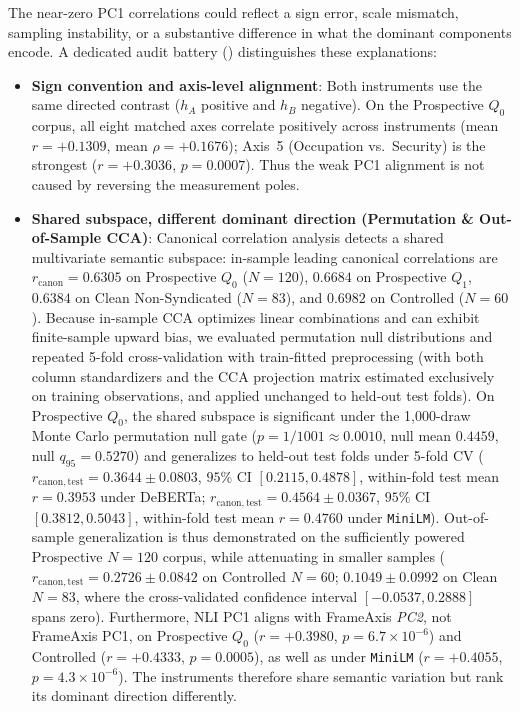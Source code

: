 The near-zero PC1 correlations could reflect a sign error, scale mismatch, sampling instability, or a substantive difference in what the dominant components encode. A dedicated audit battery () distinguishes these explanations:
\begin{itemize}
    \item \textbf{Sign convention and axis-level alignment}: Both instruments use the same directed contrast ($h_A$ positive and $h_B$ negative). On the Prospective $Q_0$ corpus, all eight matched axes correlate positively across instruments (mean $r = +0.1309$, mean $\rho = +0.1676$); Axis~5 (Occupation vs.\ Security) is the strongest ($r = +0.3036$, $p = 0.0007$). Thus the weak PC1 alignment is not caused by reversing the measurement poles.
    \item \textbf{Shared subspace, different dominant direction (Permutation \& Out-of-Sample CCA)}: Canonical correlation analysis detects a shared multivariate semantic subspace: in-sample leading canonical correlations are $r_{\mathrm{canon}} = 0.6305$ on Prospective $Q_0$ ($N=120$), $0.6684$ on Prospective $Q_1$, $0.6384$ on Clean Non-Syndicated ($N=83$), and $0.6982$ on Controlled ($N=60$). Because in-sample CCA optimizes linear combinations and can exhibit finite-sample upward bias, we evaluated permutation null distributions and repeated 5-fold cross-validation with train-fitted preprocessing (with both column standardizers and the CCA projection matrix estimated exclusively on training observations, and applied unchanged to held-out test folds). On Prospective $Q_0$, the shared subspace is significant under the 1,000-draw Monte Carlo permutation null gate ($p = 1/1001 \approx 0.0010$, null mean $0.4459$, null $q_{95} = 0.5270$) and generalizes to held-out test folds under 5-fold CV ($r_{\mathrm{canon,test}} = \mathbf{0.3644} \pm 0.0803$, $95\%$ CI $[0.2115, 0.4878]$, within-fold test mean $r = 0.3953$ under DeBERTa; $r_{\mathrm{canon,test}} = \mathbf{0.4564} \pm 0.0367$, $95\%$ CI $[0.3812, 0.5043]$, within-fold test mean $r = 0.4760$ under \texttt{MiniLM}). Out-of-sample generalization is thus demonstrated on the sufficiently powered Prospective $N=120$ corpus, while attenuating in smaller samples ($r_{\mathrm{canon,test}} = 0.2726 \pm 0.0842$ on Controlled $N=60$; $0.1049 \pm 0.0992$ on Clean $N=83$, where the cross-validated confidence interval $[-0.0537, 0.2888]$ spans zero). Furthermore, NLI PC1 aligns with FrameAxis \emph{PC2}, not FrameAxis PC1, on Prospective $Q_0$ ($r = +0.3980$, $p = 6.7 \times 10^{-6}$) and Controlled ($r = +0.4333$, $p = 0.0005$), as well as under \texttt{MiniLM} ($r = +0.4055$, $p = 4.3 \times 10^{-6}$). The instruments therefore share semantic variation but rank its dominant direction differently.

\end{itemize}
